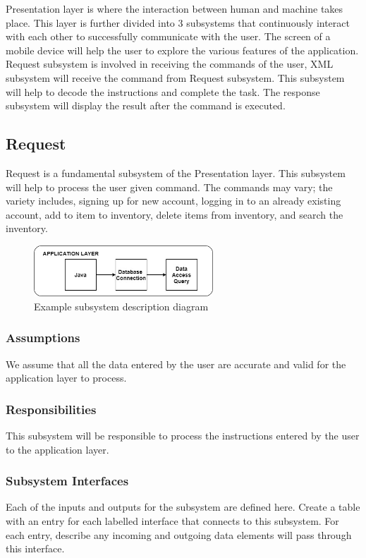 Presentation layer is where the interaction between human and machine takes place. This layer is further divided into 3 subsystems that continuously interact with each other to successfully communicate with the user. The screen of a mobile device will help the user to explore the various features of the application. Request subsystem is involved in receiving the commands of the user, XML subsystem will receive the command from Request subsystem. This subsystem will help to decode the instructions and complete the task. The response subsystem will display the result after the command is executed.

\subsection{Request}
Request is a fundamental subsystem of the Presentation layer. This subsystem will help to process the user given command. The commands may vary; the variety includes, signing up for new account, logging in to an already existing account, add to item to inventory, delete items from inventory, and search the inventory.

\begin{figure}[h!]
	\centering
 	\includegraphics[width=0.60\textwidth]{images/App.jpg}
 \caption{Example subsystem description diagram}
\end{figure}

\subsubsection{Assumptions}
We assume that all the data entered by the user are accurate and valid for the application layer to process.

\subsubsection{Responsibilities}
This subsystem will be responsible to process the instructions entered by the user to the application layer. 

\subsubsection{Subsystem Interfaces}
Each of the inputs and outputs for the subsystem are defined here. Create a table with an entry for each labelled interface that connects to this subsystem. For each entry, describe any incoming and outgoing data elements will pass through this interface.

